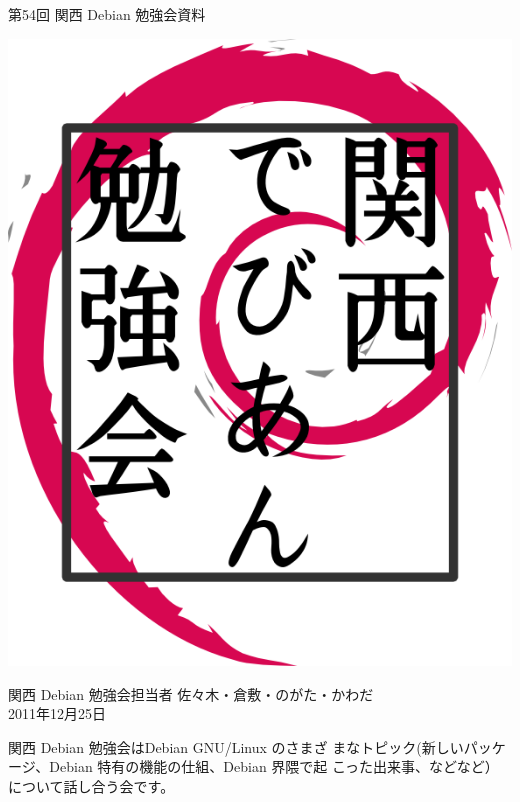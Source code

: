 \documentclass[mingoth,a4paper]{jsarticle}
\newcommand{\debmtgyear}{2011}
\newcommand{\debmtgdate}{25}
\newcommand{\debmtgmonth}{12}
\newcommand{\debmtgnumber}{54}
\begin{document}
\begin{titlepage}


 第\debmtgnumber{}回 関西 Debian 勉強会資料

\vspace{2cm}

\begin{center}
\includegraphics{image200802/kansaidebianlogo.png}
\end{center}

\begin{flushright}
\hfill{}関西 Debian 勉強会担当者 佐々木・倉敷・のがた・かわだ \\
\hfill{}\debmtgyear{}年\debmtgmonth{}月\debmtgdate{}日
\end{flushright}

\thispagestyle{empty}
\end{titlepage}


 関西 Debian 勉強会はDebian GNU/Linux のさまざ
 まなトピック(新しいパッケージ、Debian 特有の機能の仕組、Debian 界隈で起
 こった出来事、などなど）について話し合う会です。
\end{document}

